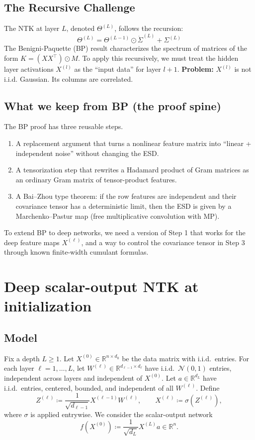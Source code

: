 \documentclass[11pt]{article}
\newcommand{\RR}{\mathbb{R}}
\begin{document}
\subsection{The Recursive Challenge}
The NTK at layer $L$, denoted $\Theta^{(L)}$, follows the recursion:
\begin{equation}
    \Theta^{(L)} = \Theta^{(L-1)} \odot \dot{\Sigma}^{(L)} + \Sigma^{(L)}
\end{equation}
The Benigni-Paquette (BP) result characterizes the spectrum of matrices of the form $K = (XX^\top) \odot M$.
To apply this recursively, we must treat the hidden layer activations $X^{(l)}$ as the ``input data'' for layer $l+1$.
\textbf{Problem:} $X^{(l)}$ is not i.i.d. Gaussian. Its columns are correlated.

\subsection{What we keep from BP (the proof spine)}
The BP proof has three reusable steps.
\begin{enumerate}
  \item A replacement argument that turns a nonlinear feature matrix into ``linear + independent noise'' without changing the ESD.
  \item A tensorization step that rewrites a Hadamard product of Gram matrices as an ordinary Gram matrix of tensor-product features.
  \item A Bai--Zhou type theorem: if the row features are independent and their covariance tensor has a deterministic limit, then the ESD is given by a Marchenko--Pastur map (free multiplicative convolution with MP).
\end{enumerate}
To extend BP to deep networks, we need a version of Step 1 that works for the deep feature maps $X^{(\ell)}$, and a way to control the covariance tensor in Step 3 through known finite-width cumulant formulas.

\section{Deep scalar-output NTK at initialization}
\label{sec:deep-model}

\subsection{Model}
Fix a depth $L\geq 1$.
Let $X^{(0)}\in\RR^{n\times d_0}$ be the data matrix with i.i.d.\ entries.
For each layer $\ell=1,\dots,L$, let $W^{(\ell)}\in\RR^{d_{\ell-1}\times d_\ell}$ have i.i.d.\ $\mathcal{N}(0,1)$ entries, independent across layers and independent of $X^{(0)}$.
Let $a\in\RR^{d_L}$ have i.i.d.\ entries, centered, bounded, and independent of all $W^{(\ell)}$.
Define
\[
  Z^{(\ell)} \coloneqq \frac{1}{\sqrt{d_{\ell-1}}}X^{(\ell-1)}W^{(\ell)},\qquad
  X^{(\ell)} \coloneqq \sigma(Z^{(\ell)}),
\]
where $\sigma$ is applied entrywise.
We consider the scalar-output network
\begin{equation}\label{eq:scalar-output}
  f(X^{(0)}) \coloneqq \frac{1}{\sqrt{d_L}}X^{(L)}a\in\RR^n.
\end{equation}
\end{document}
